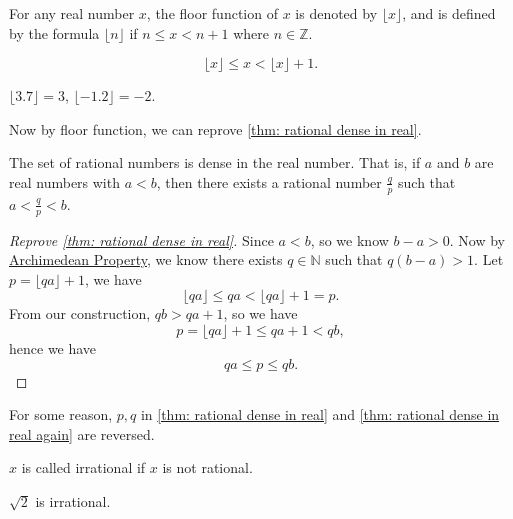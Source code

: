 \begin{definition}\label{dfn: floor func}
    For any real number \(x\), the floor function of \(x\) is denoted by \(\lfloor x \rfloor\), and is defined by the formula \(\lfloor n \rfloor\) if \(n \le x < n+1\) where \(n \in \mathbb{Z} \).      
\end{definition}
\begin{corollary}
    \[
        \lfloor x \rfloor \le x < \lfloor x \rfloor + 1.
    \]
\end{corollary}
\begin{eg}
    \(\lfloor 3.7 \rfloor = 3\), \(\lfloor -1.2 \rfloor = -2\).  
\end{eg}

Now by floor function, we can reprove \autoref{thm: rational dense in real}. 

\begin{theorem}\label{thm: rational dense in real again}
  The set of rational numbers is dense in the real number. That is, if \(a\) and \(b\) are real numbers with \(a<b\), then there exists a rational number \(\frac{q}{p}\) such that \(a < \frac{q}{p} < b\).     
\end{theorem}

\begin{proof}[Reprove \autoref{thm: rational dense in real}]
    Since \(a<b\), so we know \(b - a > 0\). Now by \hyperref[thm: Archimedean property]{Archimedean Property}, we know there exists \(q \in \mathbb{N} \) such that \(q(b-a) > 1\). Let \(p = \lfloor qa \rfloor + 1\), we have 
    \[
        \lfloor qa \rfloor \le qa < \lfloor qa \rfloor + 1 = p.
    \]     
    From our construction, \(qb > qa + 1\), so we have 
    \[
        p = \lfloor qa \rfloor + 1 \le qa + 1 < qb, 
    \]  
    hence we have 
    \[
        qa \le p \le qb.
    \]
\end{proof}

\begin{note}
    For some reason, \(p,q\) in \autoref{thm: rational dense in real} and \autoref{thm: rational dense in real again} are reversed.  
\end{note}

\begin{definition}\label{dfn: irrational num}
    \(x\) is called irrational if \(x\) is not rational.  
\end{definition}

\begin{eg}
    \(\sqrt{2} \) is irrational. 
\end{eg}

